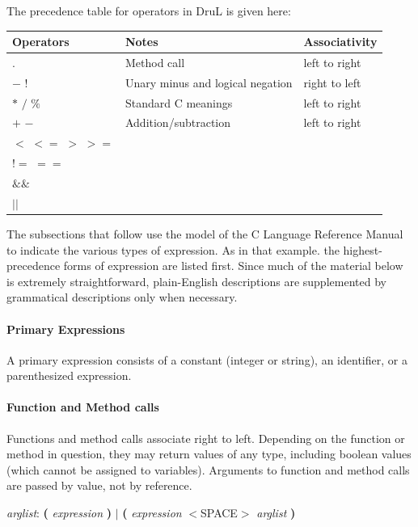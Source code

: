 The precedence table for operators in DruL is given here:

\begin{tabular}{ l |l| l}
\hline\hline
Operators         & Notes                            & Associativity \\
\hline $ . $      & Method call                      & left to right \\
$-$  $!$          & Unary minus and logical negation & right to left \\
$*$ $/$ $\%$      & Standard C meanings              & left to right \\
$+$ $-$           & Addition/subtraction             & left to right \\
$<$ $<=$ $>$ $>=$ &                                  &               \\
$!=$ $==$         &                                  &               \\
$\&\&$            &                                  &               \\
$||$              &                                  &
\end{tabular}

The subsections that follow use the model of the C Language Reference Manual to indicate the various types of expression.  As in that example. the highest-precedence forms of expression are listed first.  Since much of the material below is extremely straightforward, plain-English descriptions are supplemented by grammatical descriptions only when necessary.

\paragraph{Primary Expressions}

A primary expression consists of a constant (integer or string), an identifier, or a parenthesized expression.

\paragraph{Function and Method calls}

Functions and method calls associate right to left.  Depending on the function or method in question, they may return values of any type, including boolean values (which cannot be assigned to variables). Arguments to function and method calls are passed by value, not by reference.

\emph{arglist}: \textbf ( \emph{expression} \textbf ) $|$  \textbf ( \emph{expression} 
$<$SPACE$>$ \emph{arglist} \textbf )

